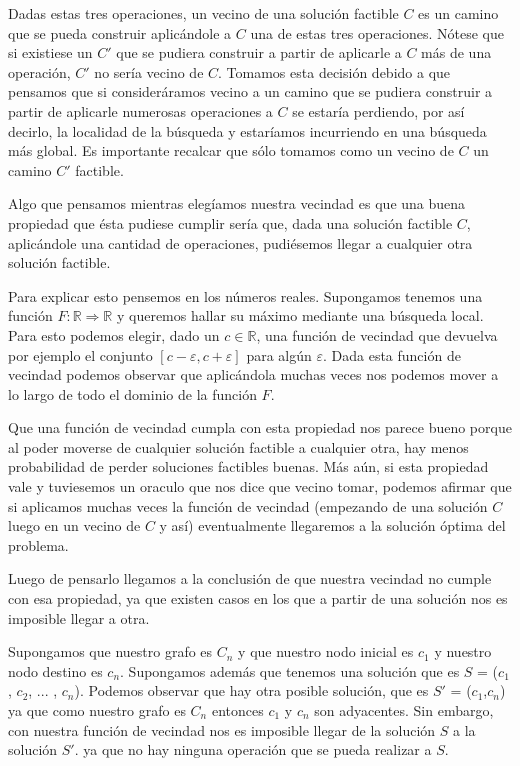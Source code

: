 Dadas estas tres operaciones, un vecino de una solución factible $C$ es un camino que se pueda construir aplicándole a $C$ una de estas tres operaciones. Nótese que si existiese un $C'$ que se pudiera construir a partir de aplicarle a $C$ más de una operación, $C'$ no sería vecino de $C$. Tomamos esta decisión debido a que pensamos que si consideráramos vecino a un camino que se pudiera construir a partir de aplicarle numerosas operaciones a $C$ se estaría perdiendo, por así decirlo, la localidad de la búsqueda y estaríamos incurriendo en una búsqueda más global. Es importante recalcar que sólo tomamos como un vecino de $C$ un camino $C'$ factible.

Algo que pensamos mientras elegíamos nuestra vecindad es que una buena propiedad que ésta pudiese cumplir sería que, dada una solución factible $C$, aplicándole una cantidad de operaciones, pudiésemos llegar a cualquier otra solución factible.

Para explicar esto pensemos en los números reales. Supongamos tenemos una función $F: \mathbb{R} \Rightarrow \mathbb{R}$ y queremos hallar su máximo mediante una búsqueda local. Para esto podemos elegir, dado un $c \in \mathbb{R}$, una función de vecindad que devuelva por ejemplo el conjunto $[c-\varepsilon, c+\varepsilon]$  para algún $\varepsilon$. Dada esta función de vecindad podemos observar que aplicándola muchas veces nos podemos mover a lo largo de todo el dominio de la función $F$.

Que una función de vecindad cumpla con esta propiedad nos parece bueno porque al poder moverse de cualquier solución factible a cualquier otra, hay menos probabilidad de perder soluciones factibles buenas. Más aún, si esta propiedad vale y tuviesemos un oraculo que nos dice que vecino tomar, podemos afirmar que si aplicamos muchas veces la función de vecindad (empezando de una solución $C$ luego en un vecino de $C$ y así) eventualmente llegaremos a la solución óptima del problema.

Luego de pensarlo llegamos a la conclusión de que nuestra vecindad no cumple con esa propiedad, ya que existen casos en los que a partir de una solución nos es imposible llegar a otra.

Supongamos que nuestro grafo es $C_n$ y que nuestro nodo inicial es $c_1$ y nuestro nodo destino es $c_n$. Supongamos además que tenemos una solución que es $S$ = ($c_1$, $c_2$, ... , $c_n$). Podemos observar que hay otra posible solución, que es $S'$ = ($c_1$,$c_n$) ya que como nuestro grafo es $C_n$ entonces $c_1$ y $c_n$ son adyacentes. Sin embargo, con nuestra función de vecindad nos es imposible llegar de la solución $S$ a la solución $S'$. ya que no hay ninguna operación que se pueda realizar a $S$.

